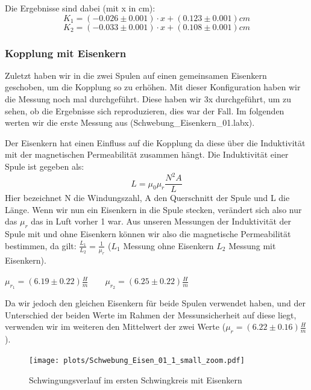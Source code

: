 \documentclass[twoside]{protokoll}
\begin{document}
Die Ergebnisse sind dabei (mit x in cm):
\begin{equation}
    K_1 = (-0.026 \pm 0.001) \cdot x + (0.123 \pm 0.001) cm
\end{equation}
\begin{equation}
    K_2 = (-0.033 \pm 0.001) \cdot x + (0.108 \pm 0.001) cm
\end{equation}

\subsubsection{Kopplung mit Eisenkern}


Zuletzt haben wir in die zwei Spulen auf einen gemeinsamen Eisenkern geschoben, um die Kopplung so zu erhöhen. 
Mit dieser Konfiguration haben wir die Messung noch mal durchgeführt. 
Diese haben wir 3x durchgeführt, um zu sehen, ob die Ergebnisse sich reproduzieren, dies war der Fall.
Im folgenden werten wir die erste Messung aus (Schwebung\_Eisenkern\_01.labx).

Der Eisenkern hat einen Einfluss auf die Kopplung da diese über die Induktivität mit der magnetischen Permeabilität zusammen hängt.
Die Induktivität einer Spule ist gegeben als:
\begin{equation}
L = \mu_0 \mu_r \frac{N^2A}{L}
\end{equation}
Hier bezeichnet N die Windungszahl, A den Querschnitt der Spule und L die Länge.
Wenn wir nun ein Eisenkern in die Spule stecken, verändert sich also nur das $\mu_r$ das in Luft vorher 1 war.
Aus unseren Messungen der Induktivität der Spule mit und ohne Eisenkern können wir also die magnetische Permeabilität bestimmen, da gilt: $\frac{L_1}{L_2} = \frac{1}{\mu_r}$ ($L_1$ Messung ohne Eisenkern $L_2$ Messung mit Eisenkern).
\begin{center}
$\mu_{r_1} = (6.19 \pm 0.22)\frac{H}{m} \qquad \mu_{r_2} = (6.25 \pm 0.22)\frac{H}{m} $
\end{center}

Da wir jedoch den gleichen Eisenkern für beide Spulen verwendet haben, und der Unterschied der beiden Werte im Rahmen der Messunsicherheit auf diese liegt, verwenden wir im weiteren den Mittelwert der zwei Werte ($\mu_r = (6.22 \pm 0.16)\frac{H}{m}$).
\begin{figure}[H]
    \centering
    \texttt{[image: plots/Schwebung\_Eisen\_01\_1\_small\_zoom.pdf]}
    \caption{Schwingungsverlauf im ersten Schwingkreis mit Eisenkern }
\end{figure}
\end{document}
